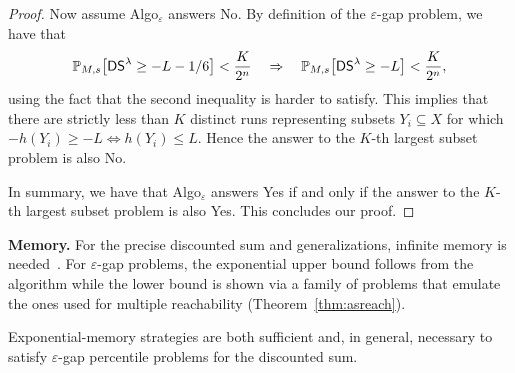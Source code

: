\documentclass{llncs}
\newcommand*{\pr}{\mathbb{P}}
\newcommand{\discSum}[1]{\ensuremath{{\sf DS}^{#1}} }
\newcommand{\discount}{\ensuremath{\lambda} }
\begin{document}
\begin{proof}
Now assume \textsf{Algo}$_{\varepsilon}$ answers \textsf{No}. By definition of the $\varepsilon$-gap problem, we have that
\begin{equation*}
\pr_{M,s} \big[\discSum{\discount} \geq -L-1/6\big] < \dfrac{K}{2^{n}} \quad\Rightarrow\quad \pr_{M,s} \big[\discSum{\discount} \geq -L\big] < \dfrac{K}{2^{n}},
\end{equation*}
using the fact that the second inequality is harder to satisfy. This implies that there are strictly less than $K$ distinct runs representing subsets $Y_{i} \subseteq X$ for which $-h(Y_{i}) \geq -L \Leftrightarrow h(Y_{i}) \leq L$. Hence the answer to the $K$-th largest subset problem is also \textsf{No}.

In summary, we have that \textsf{Algo}$_{\varepsilon}$ answers \textsf{Yes} if and only if the answer to the $K$-th largest subset problem is also \textsf{Yes}. This concludes our proof.
\end{proof}

\smallskip\noindent\textbf{Memory.} For the precise discounted sum and
generalizations, infinite memory is
needed~\cite{DBLP:conf/lpar/ChatterjeeFW13}. For $\varepsilon$-gap problems,
the exponential upper bound follows from the algorithm while the lower bound is
shown via a family of problems that emulate the ones used for multiple
reachability (Theorem~\ref{thm:asreach}). 

\begin{lemma}
\label{lem:ds_memory}
Exponential-memory strategies are both sufficient and, in general, necessary to satisfy $\varepsilon$-gap percentile problems for the discounted sum.
\end{lemma}
\end{document}
